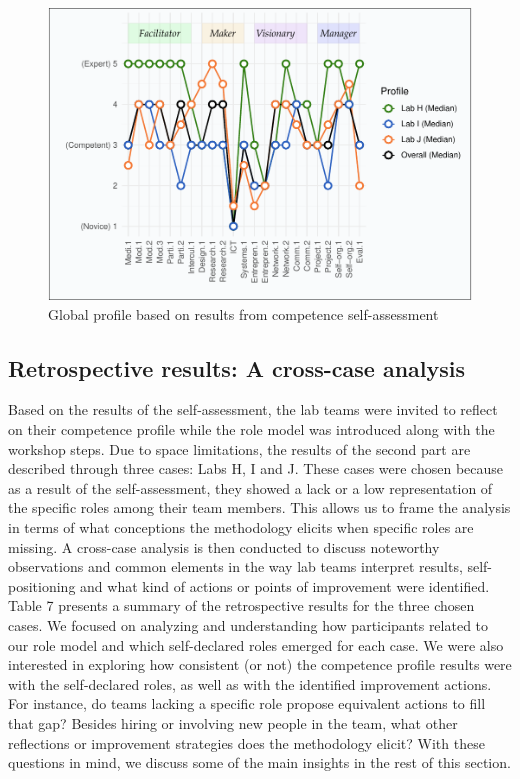 \documentclass[AMA,STIX1COL,APA,STIX2COL]{WileyNJD-v2}
\begin{document}
\begin{figure}[b]

{\centering \includegraphics[width=468px]{index_files/figure-latex/fig3-1} 

}

\caption{Global profile based on results from competence self-assessment}\label{fig:fig3}
\end{figure}

\hypertarget{retrospective-results-a-cross-case-analysis}{%
\subsection{Retrospective results: A cross-case
analysis}\label{retrospective-results-a-cross-case-analysis}}

Based on the results of the self-assessment, the lab teams were invited
to reflect on their competence profile while the role model was
introduced along with the workshop steps. Due to space limitations, the
results of the second part are described through three cases: Labs H, I
and J. These cases were chosen because as a result of the
self-assessment, they showed a lack or a low representation of the
specific roles among their team members. This allows us to frame the
analysis in terms of what conceptions the methodology elicits when
specific roles are missing. A cross-case analysis is then conducted to
discuss noteworthy observations and common elements in the way lab teams
interpret results, self-positioning and what kind of actions or points
of improvement were identified. Table 7 presents a summary of the
retrospective results for the three chosen cases. We focused on
analyzing and understanding how participants related to our role model
and which self-declared roles emerged for each case. We were also
interested in exploring how consistent (or not) the competence profile
results were with the self-declared roles, as well as with the
identified improvement actions. For instance, do teams lacking a
specific role propose equivalent actions to fill that gap? Besides
hiring or involving new people in the team, what other reflections or
improvement strategies does the methodology elicit? With these questions
in mind, we discuss some of the main insights in the rest of this
section.
\end{document}
